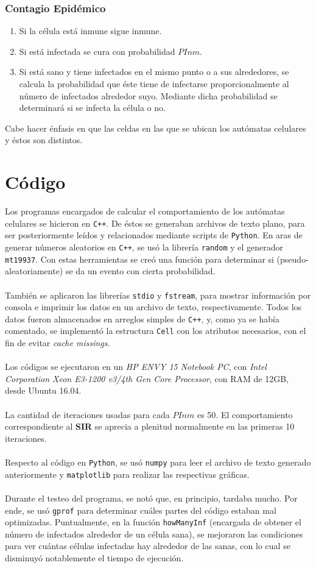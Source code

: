 \documentclass[twoside,twocolumn]{article}
\newcommand{\code}[1]{\colorbox{light-gray}{\texttt{#1}}}
\begin{document}
\subsubsection{Contagio Epidémico}
\begin{enumerate}
\item Si la célula está inmune sigue inmune.
\item Si está infectada se cura con probabilidad $PInm$.
\item Si está sano y tiene infectados en el mismo punto o a sus alrededores, se calcula la probabilidad que éste tiene de infectarse proporcionalmente al número de infectados alrededor suyo. Mediante dicha probabilidad se determinará si se infecta la célula o no.
\end{enumerate}
Cabe hacer énfasis en que las celdas en las que se ubican los autómatas celulares y éstos son distintos.

\section{Código}
Los programas encargados de calcular el comportamiento de los autómatas celulares se hicieron en \code{C++}. De éstos se generaban archivos de texto plano, para ser posteriormente leídos y relacionados mediante scripts de \code{Python}. En aras de generar números aleatorios en \code{C++}, se usó la librería \code{random} y el generador \code{mt19937}. Con estas herramientas se creó una función para determinar si (pseudo-aleatoriamente) se da un evento con cierta probabilidad.\\ \\
También se aplicaron las librerías \code{stdio} y \code{fstream}, para mostrar información por consola e imprimir los datos en un archivo de texto, respectivamente. Todos los datos fueron almacenados en arreglos simples de \code{C++}, y, como ya se había comentado, se implementó la estructura \code{Cell} con los atributos necesarios, con el fin de evitar \textit{cache missings}.\\ \\
Los códigos se ejecutaron en un \textit{HP ENVY 15 Notebook PC}, con \textit{Intel Corporation Xeon E3-1200 v3/4th Gen Core Processor}, con RAM de 12GB, desde Ubuntu 16.04.\\ \\
La cantidad de iteraciones usadas para cada $PInm$ es 50. El comportamiento correspondiente al \textbf{SIR} se aprecia a plenitud normalmente en las primeras 10 iteraciones.\\ \\
Respecto al código en \code{Python}, se usó \code{numpy} para leer el archivo de texto generado anteriormente y \code{matplotlib} para realizar las respectivas gráficas.\\ \\
Durante el testeo del programa, se notó que, en principio, tardaba mucho. Por ende, se usó \code{gprof} para determinar cuáles partes del código estaban mal optimizadas. Puntualmente, en la función \code{howManyInf} (encargada de obtener el número de infectados alrededor de un célula sana), se mejoraron las condiciones para ver cuántas células infectadas hay alrededor de las sanas, con lo cual se disminuyó notablemente el tiempo de ejecución.
\end{document}
